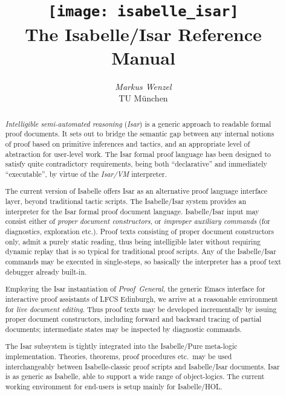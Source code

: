 \documentclass[12pt,a4paper,fleqn]{report}
\title{\texttt{[image: isabelle\_isar]} \\[4ex] The Isabelle/Isar Reference Manual}
\author{\emph{Markus Wenzel} \\ TU M\"unchen}
\begin{document}
\underscoreoff

\maketitle 

\begin{abstract}
  \emph{Intelligible semi-automated reasoning} (\emph{Isar}) is a generic
  approach to readable formal proof documents.  It sets out to bridge the
  semantic gap between any internal notions of proof based on primitive
  inferences and tactics, and an appropriate level of abstraction for
  user-level work.  The Isar formal proof language has been designed to
  satisfy quite contradictory requirements, being both ``declarative'' and
  immediately ``executable'', by virtue of the \emph{Isar/VM} interpreter.
  
  The current version of Isabelle offers Isar as an alternative proof language
  interface layer, beyond traditional tactic scripts.  The Isabelle/Isar
  system provides an interpreter for the Isar formal proof document language.
  Isabelle/Isar input may consist either of \emph{proper document
    constructors}, or \emph{improper auxiliary commands} (for diagnostics,
  exploration etc.).  Proof texts consisting of proper document constructors
  only, admit a purely static reading, thus being intelligible later without
  requiring dynamic replay that is so typical for traditional proof scripts.
  Any of the Isabelle/Isar commands may be executed in single-steps, so
  basically the interpreter has a proof text debugger already built-in.
  
  Employing the Isar instantiation of \emph{Proof~General}, the generic Emacs
  interface for interactive proof assistants of LFCS Edinburgh, we arrive at a
  reasonable environment for \emph{live document editing}.  Thus proof texts
  may be developed incrementally by issuing proper document constructors,
  including forward and backward tracing of partial documents; intermediate
  states may be inspected by diagnostic commands.
  
  The Isar subsystem is tightly integrated into the Isabelle/Pure meta-logic
  implementation.  Theories, theorems, proof procedures etc.\ may be used
  interchangeably between Isabelle-classic proof scripts and Isabelle/Isar
  documents.  Isar is as generic as Isabelle, able to support a wide range of
  object-logics.  The current working environment for end-users is setup
  mainly for Isabelle/HOL.
\end{abstract}

 \tableofcontents \clearfirst

\nocite{Rudnicki:1992:MizarOverview}
\nocite{Harrison:1996:MizarHOL}
\nocite{Rudnicki:1992:MizarOverview}
\nocite{Trybulec:1993:MizarFeatures}
\nocite{Syme:1997:DECLARE}
\nocite{Syme:1998:thesis}
\nocite{Syme:1999:TPHOL}








\begingroup
   \small\raggedright\frenchspacing
  
\endgroup


\end{document}
